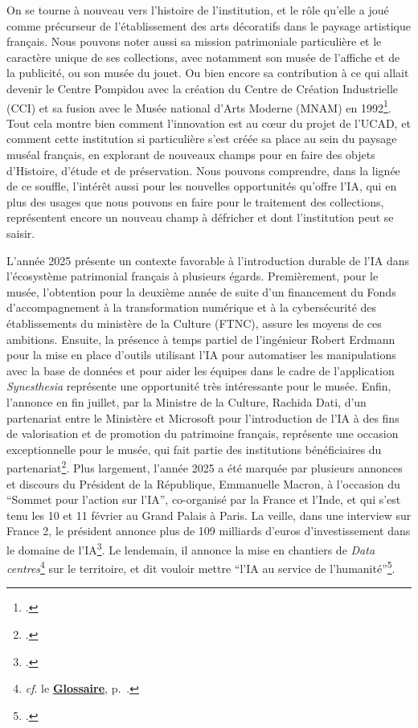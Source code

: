 On se tourne à nouveau vers l'histoire de l'institution, et le rôle qu'elle a joué comme précurseur de l'établissement des arts décoratifs dans le paysage artistique français. Nous pouvons noter aussi sa mission patrimoniale particulière et le caractère unique de ses collections, avec notamment son musée de l'affiche et de la publicité, ou son musée du jouet. Ou bien encore sa contribution à ce qui allait devenir le Centre Pompidou avec la création du Centre de Création Industrielle (CCI) et sa fusion avec le Musée national d'Arts Moderne (MNAM) en 1992\footnote{\cite{caroll_centre_nodate}.}. Tout cela montre bien comment l'innovation est au cœur du projet de l'UCAD, et comment cette institution si particulière s'est créée sa place au sein du paysage muséal français, en explorant de nouveaux champs pour en faire des objets d'Histoire, d'étude et de préservation. Nous pouvons comprendre, dans la lignée de ce souffle, l'intérêt aussi pour les nouvelles opportunités qu'offre l'IA, qui en plus des usages que nous pouvons en faire pour le traitement des collections, représentent encore un nouveau champ à défricher et dont l'institution peut se saisir.

L'année 2025 présente un contexte favorable à l'introduction durable de l'IA dans l'écosystème patrimonial français à plusieurs égards. Premièrement, pour le musée, l'obtention pour la deuxième année de suite d'un financement du Fonds d’accompagnement à la transformation numérique et à la cybersécurité des établissements du ministère de la Culture (FTNC), assure les moyens de ces ambitions. Ensuite, la présence à temps partiel de l'ingénieur Robert Erdmann pour la mise en place d'outils utilisant l'IA pour automatiser les manipulations avec la base de données et pour aider les équipes dans le cadre de l'application \textit{Synesthesia} représente une opportunité très intéressante pour le musée. Enfin, l'annonce en fin juillet, par la Ministre de la Culture, Rachida Dati, d'un partenariat entre le Ministère et Microsoft pour l'introduction de l'IA à des fins de valorisation et de promotion du patrimoine français, représente une occasion exceptionnelle pour le musée, qui fait partie des institutions bénéficiaires du partenariat\footnote{\cite{noauthor_discours_2025}.}. Plus largement, l'année 2025 a été marquée par plusieurs annonces et discours du Président de la République, Emmanuelle Macron, à l'occasion du \enquote{Sommet pour l'action sur l'IA}, co-organisé par la France et l'Inde, et qui s'est tenu les 10 et 11 février au Grand Palais à Paris. La veille, dans une interview sur France 2, le président annonce plus de 109 milliards d'euros d'investissement dans le domaine de l'IA\footnote{\cite{noauthor_replay_2025}.}. Le lendemain, il annonce la mise en chantiers de \textit{Data centres}\footnote{\textit{cf}. le \textbf{\hyperref[sec:Glossaire]{Glossaire}}, p.~\pageref{sec:Glossaire}.} sur le territoire, et dit vouloir mettre \enquote{l'IA au service de l'humanité}\footnote{\cite{noauthor_prononce_2025}.}. 

